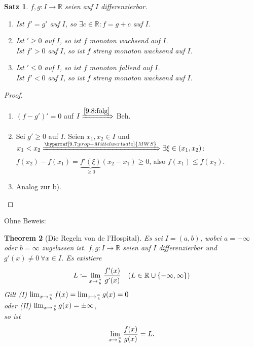 \documentclass[14pt,titlepage,ngerman,a4paper,headsepline,DIV15,halfparskip*]{scrartcl}
\newcommand{\R}{\mathbb{R}}
\theoremstyle{named}
\newtheorem{namedtheorem}{Theorem} \counterwithin{namedtheorem}{section}
\theoremstyle{dotless}
\newtheorem{satz}[namedtheorem]{Satz}
\begin{document}
\begin{satz} \label{9.10:satz}
	$f, g \colon I \rightarrow \R$ seien auf $I$ differenzierbar.
	\begin{enumerate}
		\item Ist $f' = g'$ auf $I$, so $\exists c \in \R: f = g + c$ auf $I$.
		\item Ist $' \geq 0$ auf $I$, so ist $f$ monoton wachsend auf $I$. \\
				Ist $f' > 0$ auf $I$, so ist $f$ streng monoton wachsend auf $I$.
		\item Ist $' \leq 0$ auf $I$, so ist $f$ monoton fallend auf $I$. \\
				Ist $f' < 0$ auf $I$, so ist $f$ streng monoton wachsend auf $I$.
	\end{enumerate}
\end{satz}

\begin{proof}  ~\
	\begin{enumerate}
		\item $(f - g')' = 0$ auf $I \xRightarrow[]{\ref{9.8:folg}}$ Beh.
		\item Sei $g' \geq 0$ auf $I$. Seien $x_{1}, x_{2} \in I$ und $x_{1} < x_{2} \xRightarrow[]{\hyperref[9.7:prop-Mittelwertsatz]{MWS}} \exists \xi \in (x_{1}, x_{2})$: $f(x_{2}) - f(x_{1}) = \underbrace{f'(\xi)}_{\geq 0} (x_{2} - x_{1}) \geq 0$, also $f(x_{1}) \leq f(x_{2})$.
		\item Analog zur b).
	\end{enumerate}
\end{proof}

Ohne Beweis:
\begin{namedtheorem}[Die Regeln von de l'Hospital] \label{9.11:prop:lHopital}
	Es sei $I = (a, b)$, wobei $a = -\infty$ oder $b = \infty$ zugelassen ist. $f, g \colon I \rightarrow \R$ seien auf $I$ differenzierbar und $g'(x) \neq 0 ~\forall x \in I$. Es existiere
	$$ L \coloneqq \lim_{x \rightarrow {a \above 0pt b}} \frac{f'(x)}{g'(x)} \quad  (L \in \R \cup \{ - \infty, \infty \}) $$
	Gilt (I) $\lim_{x \rightarrow {a \above 0pt b}} f(x) = \lim_{x \rightarrow {a \above 0pt b}} g(x) = 0$ \\
	oder (II) $\lim_{x \rightarrow {a \above 0pt b}} g(x) = \pm \infty$, \\
	so ist 
	$$ \lim_{x \rightarrow {a \above 0pt b}} \frac{f(x)}{g(x)} = L. $$
\end{namedtheorem}
\end{document}
